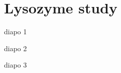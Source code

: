 \documentclass{beamer}
\begin{document}
\section{Lysozyme study}

\begin{frame}{diapo 1}
\lipsum[1]
\end{frame}

\begin{frame}{diapo 2}
\lipsum[1]
\end{frame}

\begin{frame}{diapo 3}
\lipsum[1]
\end{frame}
\end{document}
